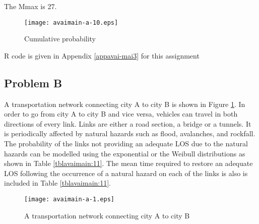 The Mmax is 27.

\begin{figure}[h]
\texttt{[image: avaimain-a-10.eps]}
\caption{Cumulative probability}
\end{figure}
R code is given in Appendix \ref{appavai-mai3} for this assignment

\subsection{Problem B}
A transportation network connecting city A to city B is shown in Figure
\ref{figavaimain-a:2}. In order to go from city A to city B and vice versa, vehicles can
travel in both directions of every link. Links are either a road section, a
bridge or a tunnels. It is periodically affected by natural hazards such as
flood, avalanches, and rockfall. The probability of the links not providing an
adequate LOS due to the natural hazards can be modelled using the exponential or
the Weibull distributions as shown in Table \ref{tblavaimain:11}. The mean time required
to restore an adequate LOS following the occurrence of a natural hazard on each
of the links is also is included in Table \ref{tblavaimain:11}.

\begin{figure}[h]
\begin{center}
\texttt{[image: avaimain-a-1.eps]}
\caption{A transportation network connecting city A to city B}\label{figavaimain-a:2}
\end{center}
\end{figure}

